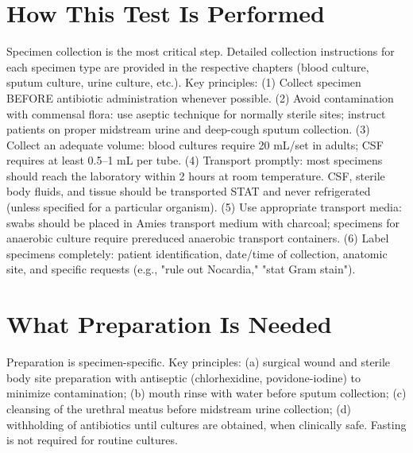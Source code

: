 \section*{How This Test Is Performed}
Specimen collection is the most critical step. Detailed collection instructions for each specimen type are provided in the respective chapters (blood culture, sputum culture, urine culture, etc.). Key principles: (1) Collect specimen BEFORE antibiotic administration whenever possible. (2) Avoid contamination with commensal flora: use aseptic technique for normally sterile sites; instruct patients on proper midstream urine and deep-cough sputum collection. (3) Collect an adequate volume: blood cultures require 20 mL/set in adults; CSF requires at least 0.5--1 mL per tube. (4) Transport promptly: most specimens should reach the laboratory within 2 hours at room temperature. CSF, sterile body fluids, and tissue should be transported STAT and never refrigerated (unless specified for a particular organism). (5) Use appropriate transport media: swabs should be placed in Amies transport medium with charcoal; specimens for anaerobic culture require prereduced anaerobic transport containers. (6) Label specimens completely: patient identification, date/time of collection, anatomic site, and specific requests (e.g., "rule out Nocardia," "stat Gram stain").

\section*{What Preparation Is Needed}
Preparation is specimen-specific. Key principles: (a) surgical wound and sterile body site preparation with antiseptic (chlorhexidine, povidone-iodine) to minimize contamination; (b) mouth rinse with water before sputum collection; (c) cleansing of the urethral meatus before midstream urine collection; (d) withholding of antibiotics until cultures are obtained, when clinically safe. Fasting is not required for routine cultures.

